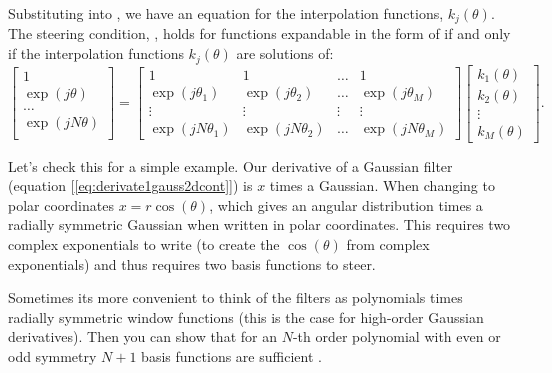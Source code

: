 Substituting \eqn{\ref{eq:fourierseriesinangle}} into
\eqn{\ref{eq:steeringcondition}}, we have an equation for the
interpolation functions, $k_{j}(\theta)$.
The steering condition, \eqn{\ref{eq:steeringcondition}}, holds for functions
expandable in the form of \eqn{\ref{eq:fourierseriesinangle}} if and only if the
interpolation functions $k_{j}(\theta)$ are solutions of:
\begin{equation}
	\left[
		\begin{array}{c}
			1                 \\
			\exp (j \theta)   \\
			\ldots            \\
			\exp (j N \theta) \\
		\end{array}
		\right]
	=
	\left[
		\begin{array}{cccc}
			1                     & 1                     & \ldots & 1                     \\
			\exp (j \theta_{1})   & \exp (j \theta_{2})   & \ldots & \exp (j \theta_{M})   \\
			\vdots                & \vdots                & \vdots & \vdots                \\
			\exp (j N \theta_{1}) & \exp (j N \theta_{2}) & \ldots & \exp (j N \theta_{M})
		\end{array}
		\right]
	\left[
		\begin{array}{c}
			k_{1}(\theta) \\ k_{2}(\theta) \\ \vdots \\ k_{M}(\theta)
		\end{array}
		\right].
	\label{eq:theorembigmatrix}
\end{equation}

Let's check this for a simple example.  Our derivative of a Gaussian filter (equation [\ref{eq:derivate1gauss2dcont}]) is $x$ times a
Gaussian.  When changing to polar coordinates $x=r \cos( \theta)$, which gives an angular distribution times a radially symmetric Gaussian when written in polar coordinates.  This requires two complex exponentials to write (to create the $\cos (\theta)$ from complex exponentials) and thus requires two basis functions to steer.

Sometimes its more convenient to think of the filters as polynomials times radially symmetric window functions (this is the case for high-order Gaussian derivatives).  Then you can show that for an $N$-th order polynomial with even or odd symmetry $N+1$ basis functions are sufficient \cite{Freeman91}.

